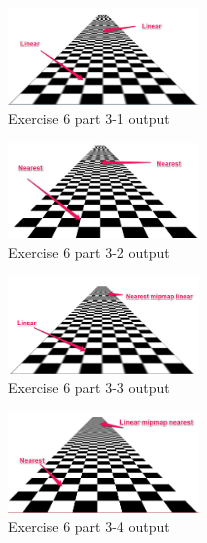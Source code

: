 \begin{figure}[ht!]
	\begin{center}
		\includegraphics[width=0.45\textwidth]{figures/exercise_6_part_4_1}
	\end{center}
	\vspace{-4.5ex}\caption{Exercise 6 part 3-1 output}
	\label{fig:exercise_6_part_4_1} 
\end{figure}
\begin{figure}[ht!]
	\begin{center}
		\includegraphics[width=0.45\textwidth]{figures/exercise_6_part_4_2}
	\end{center}
	\vspace{-4.5ex}\caption{Exercise 6 part 3-2 output}
	\label{fig:exercise_6_part_4_2} 
\end{figure}
\begin{figure}[ht!]
	\begin{center}
		\includegraphics[width=0.45\textwidth]{figures/exercise_6_part_4_3}
	\end{center}
	\vspace{-4.5ex}\caption{Exercise 6 part 3-3 output}
	\label{fig:exercise_6_part_4_3} 
\end{figure}
\begin{figure}[ht!]
	\begin{center}
		\includegraphics[width=0.45\textwidth]{figures/exercise_6_part_4_4}
	\end{center}
	\vspace{-4.5ex}\caption{Exercise 6 part 3-4 output}
	\label{fig:exercise_6_part_4_4} 
\end{figure}

